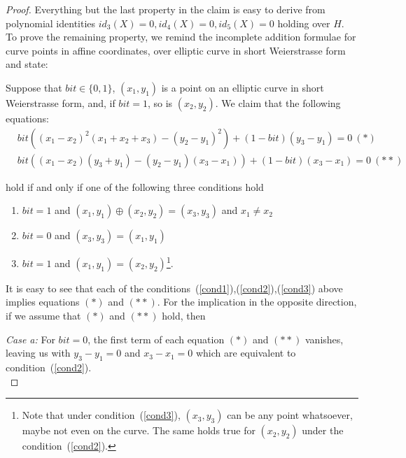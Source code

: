 \begin{proof} Everything but the last property in the claim is easy to derive from polynomial identities 
$id_3(X) =0, id_4(X )= 0, id_5(X) = 0$ holding over $H$. To prove the remaining property, we remind 
the incomplete addition formulae for curve points in affine coordinates, over elliptic curve in short Weierstrasse form and state:\\ 
\vspace{-0.3cm}

\begin{observation} \label{obs} Suppose that $\mathit{bit} \in \{0,1\}$, $(x_1,y_1)$ is a point on an elliptic curve in 
short Weierstrasse form, and, if $\mathit{bit} = 1$, so is $(x_2,y_2)$. We claim that the following equations: 
\begin{align*}
&\mathit{bit}((x_1 - x_2)^2 (x_1 + x_2 + x_3) - (y_2 - y_1)^2 ) + (1 - \mathit{bit})(y_3 - y_1) =0 \ (\ast)\\
&\mathit{bit}((x_1 - x_2)(y_3 + y_1) - (y_2 - y_1)(x_3 - x_1)) + (1 - \mathit{bit})(x_3 - x_1) =0 \ (\ast\ast)
\end{align*}

\noindent hold if and only if one of the following three conditions hold 

\begin{enumerate}
\item \label{cond1} $\mathit{bit}=1$ and $(x_1,y_1)\oplus(x_2,y_2)=(x_3,y_3)$ and $x_1 \neq x_2$
\item \label{cond2} $\mathit{bit}=0$ and $(x_3,y_3)=(x_1,y_1)$ 
\item  \label{cond3} $\mathit{bit}=1$ and $(x_1,y_1)=(x_2,y_2)$\footnote{Note that under condition~(\ref{cond3}), $(x_3,y_3)$ 
can be any point whatsoever, maybe not even on the curve. The same holds true for $(x_2, y_2)$ under the condition~(\ref{cond2}).}.
\end{enumerate}
\end{observation}

\noindent It is easy to see that each of the conditions~(\ref{cond1}),(\ref{cond2}),(\ref{cond3}) above implies equations $(\ast)$ and $(\ast \ast)$.
\noindent For the implication in the opposite direction, if we assume that $(\ast)$ and $(\ast \ast)$ hold, then \\
\vspace{-0.1in}

\noindent \textit{Case a:} For $\mathit{bit}=0$, the first term of each equation $(\ast)$ and $(\ast \ast)$ vanishes, 
leaving us with $y_3-y_1=0$ and $x_3-x_1=0$ which are equivalent to condition~(\ref{cond2}). \\
\vspace{-0.1in}


\end{proof}
